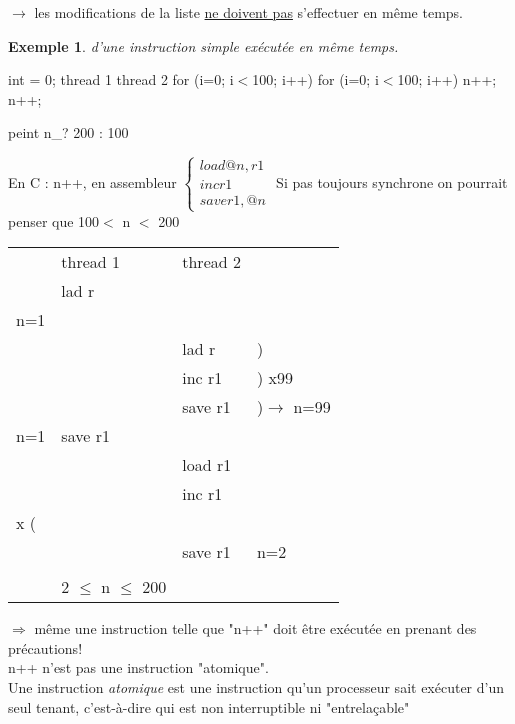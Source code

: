 \documentclass[12pt,a4paper]{report}
\newtheorem*{ex}{Exemple}
\begin{document}
$\rightarrow$ les modifications de la liste \underline{ne doivent pas} s'effectuer en même temps.\\

\begin{ex} d'une instruction simple exécutée en même temps.\end{ex}
\begin{verbatimtab}
                           int = 0;
thread 1                                thread 2
for (i=0; i$<$100; i++)                 for (i=0; i$<$100; i++)
    n++;                                     n++;

                        peint n_? 200 : 100
\end{verbatimtab}
En C : n++, en assembleur $\left\{\begin{array}{l} load @n, r1\\ inc r1 \\ save r1,@n
\end{array} \right.$
Si pas toujours synchrone on pourrait penser que 100$<$ n $<$ 200\\

\begin{center}
\begin{tabular}{lp{4cm}p{4cm}l}
& thread 1 & thread 2 & \\
& lad r & &\\
n=1 & & &\\
\hdashline
& & lad r & ) \\
& & inc r1 & ) x99\\
& & save r1 & )$\rightarrow$ n=99\\
\hdashline
n=1 & save r1 & & \\
\hdashline
& & load r1 & \\
& & inc r1 & \\
\hdashline
99 x ( & & &\\
\hdashline
& & save r1 & n=2\\
\\
& 2 $\leq$ n $\leq$ 200
\end{tabular}
\end{center}

$\Rightarrow$ même une instruction telle que "n++" doit être exécutée en prenant des précautions!\\
n++ n'est pas une instruction "atomique".\\
Une instruction \emph{atomique} est une instruction qu'un processeur sait exécuter d'un seul tenant, c'est-à-dire qui est non interruptible ni "entrelaçable"\\
\end{document}
